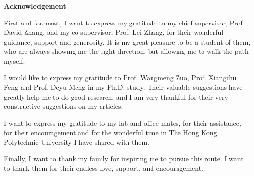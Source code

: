 
\Large\begin{center}
\textbf{Acknowledgement} \end{center}         \normalsize
First and foremost, I want to express my gratitude to my chief-supervisor, Prof. David Zhang, and my co-supervisor, Prof. Lei Zhang, for their wonderful guidance, support and generosity. It is my great pleasure to be a student of them, who are always showing me the right direction, but allowing me to walk the path myself.

I would like to express my gratitude to Prof. Wangmeng Zuo, Prof. Xiangchu Feng
and Prof. Deyu Meng in my Ph.D. study. Their valuable suggestions have greatly help me
to do good research, and I am very thankful for their very constructive suggestions on my
articles. 

I want to express my gratitude to my lab and office mates, for their assistance, for
their encouragement and for the wonderful time in The Hong Kong Polytechnic University I
have shared with them.

Finally, I want to thank my family for inspiring me to pursue this route. I want to
thank them for their endless love, support, and encouragement.